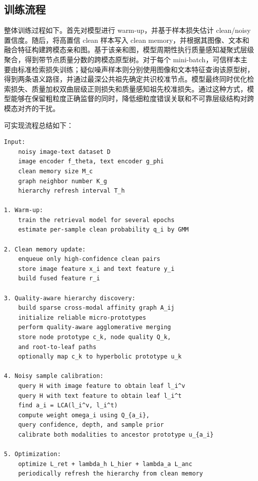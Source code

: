 \subsection{训练流程}

整体训练过程如下。首先对模型进行 warm-up，并基于样本损失估计 clean/noisy 置信度。随后，将高置信 clean 样本写入 clean memory，并根据其图像、文本和融合特征构建跨模态亲和图。基于该亲和图，模型周期性执行质量感知凝聚式层级聚合，得到带节点质量分数的跨模态原型树。对于每个 mini-batch，可信样本主要由标准检索损失训练；疑似噪声样本则分别使用图像和文本特征查询该原型树，得到两条语义路径，并通过最深公共祖先确定共识校准节点。模型最终同时优化检索损失、质量加权双曲层级正则损失和质量感知祖先校准损失。通过这种方式，模型能够在保留粗粒度正确监督的同时，降低细粒度错误关联和不可靠层级结构对跨模态对齐的干扰。

可实现流程总结如下：
\begin{verbatim}
Input:
    noisy image-text dataset D
    image encoder f_theta, text encoder g_phi
    clean memory size M_c
    graph neighbor number K_g
    hierarchy refresh interval T_h

1. Warm-up:
    train the retrieval model for several epochs
    estimate per-sample clean probability q_i by GMM

2. Clean memory update:
    enqueue only high-confidence clean pairs
    store image feature x_i and text feature y_i
    build fused feature r_i

3. Quality-aware hierarchy discovery:
    build sparse cross-modal affinity graph A_ij
    initialize reliable micro-prototypes
    perform quality-aware agglomerative merging
    store node prototype c_k, node quality Q_k,
    and root-to-leaf paths
    optionally map c_k to hyperbolic prototype u_k

4. Noisy sample calibration:
    query H with image feature to obtain leaf l_i^v
    query H with text feature to obtain leaf l_i^t
    find a_i = LCA(l_i^v, l_i^t)
    compute weight omega_i using Q_{a_i},
    query confidence, depth, and sample prior
    calibrate both modalities to ancestor prototype u_{a_i}

5. Optimization:
    optimize L_ret + lambda_h L_hier + lambda_a L_anc
    periodically refresh the hierarchy from clean memory
\end{verbatim}
